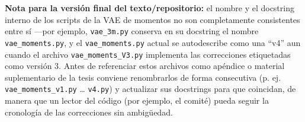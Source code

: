 \noindent
\textbf{Nota para la versión final del texto/repositorio:} el nombre y el
docstring interno de los scripts de la VAE de momentos no son
completamente consistentes entre sí —por ejemplo, \texttt{vae\_3m.py}
conserva en su docstring el nombre \texttt{vae\_moments.py}, y el
\texttt{vae\_moments.py} actual se autodescribe como una ``v4'' aun cuando
el archivo \texttt{vae\_moments\_V3.py} implementa las correcciones
etiquetadas como versión 3. Antes de referenciar estos archivos como
apéndice o material suplementario de la tesis conviene renombrarlos de
forma consecutiva (p. ej. \texttt{vae\_moments\_v1.py} \ldots
\texttt{v4.py}) y actualizar sus docstrings para que coincidan, de manera
que un lector del código (por ejemplo, el comité) pueda seguir la
cronología de las correcciones sin ambigüedad.
